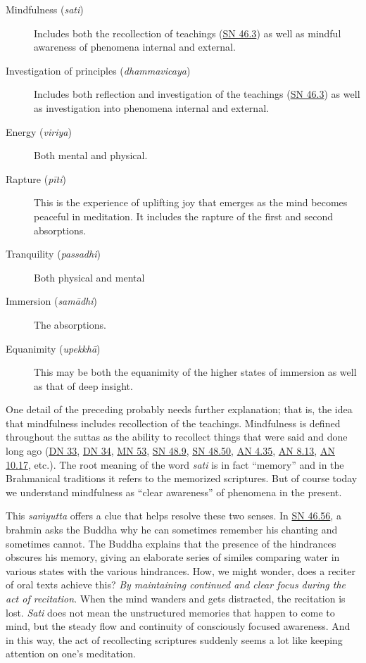 \documentclass[12pt,openany]{book}%
\begin{document}
\begin{description}%
\item[Mindfulness (\textit{sati})] Includes both the recollection of teachings (\href{https://suttacentral.net/sn46.3}{SN 46.3}) as well as mindful awareness of phenomena internal and external.%
\item[Investigation of principles (\textit{dhammavicaya})] Includes both reflection and investigation of the teachings (\href{https://suttacentral.net/sn46.3}{SN 46.3}) as well as investigation into phenomena internal and external.%
\item[Energy (\textit{viriya})] Both mental and physical.%
\item[Rapture (\textit{\textsanskrit{pīti}})] This is the experience of uplifting joy that emerges as the mind becomes peaceful in meditation. It includes the rapture of the first and second absorptions.%
\item[Tranquility (\textit{passadhi})] Both physical and mental%
\item[Immersion (\textit{\textsanskrit{samādhi}})] The absorptions.%
\item[Equanimity (\textit{\textsanskrit{upekkhā}})] This may be both the equanimity of the higher states of immersion as well as that of deep insight.%
\end{description}

One detail of the preceding probably needs further explanation; that is, the idea that mindfulness includes recollection of the teachings. Mindfulness is defined throughout the suttas as the ability to recollect things that were said and done long ago (\href{https://suttacentral.net/dn33}{DN 33}, \href{https://suttacentral.net/dn34}{DN 34}, \href{https://suttacentral.net/mn53}{MN 53}, \href{https://suttacentral.net/sn48.9}{SN 48.9}, \href{https://suttacentral.net/sn48.50}{SN 48.50}, \href{https://suttacentral.net/an4.35}{AN 4.35}, \href{https://suttacentral.net/an8.13}{AN 8.13}, \href{https://suttacentral.net/an10.17}{AN 10.17}, etc.). The root meaning of the word \textit{sati} is in fact “memory” and in the Brahmanical traditions it refers to the memorized scriptures. But of course today we understand mindfulness as “clear awareness” of phenomena in the present.

This \textit{\textsanskrit{saṁyutta}} offers a clue that helps resolve these two senses. In \href{https://suttacentral.net/sn46.56}{SN 46.56}, a brahmin asks the Buddha why he can sometimes remember his chanting and sometimes cannot. The Buddha explains that the presence of the hindrances obscures his memory, giving an elaborate series of similes comparing water in various states with the various hindrances. How, we might wonder, does a reciter of oral texts achieve this? \emph{By maintaining continued and clear focus during the act of recitation}. When the mind wanders and gets distracted, the recitation is lost. \textit{Sati} does not mean the unstructured memories that happen to come to mind, but the steady flow and continuity of consciously focused awareness. And in this way, the act of recollecting scriptures suddenly seems a lot like keeping attention on one’s meditation.
\end{document}
